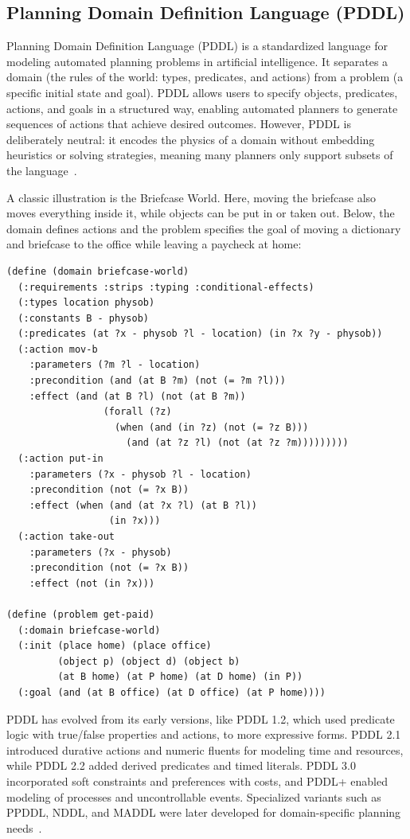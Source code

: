 \documentclass[12pt]{extarticle}
\begin{document}
\subsection{Planning Domain Definition Language (PDDL)}
\label{sec: pddl}
Planning Domain Definition Language (PDDL) is a standardized language for modeling automated planning problems in artificial intelligence. It separates a domain (the rules of the world: types, predicates, and actions) from a problem (a specific initial state and goal). PDDL allows users to specify objects, predicates, actions, and goals in a structured way, enabling automated planners to generate sequences of actions that achieve desired outcomes. However, PDDL is deliberately neutral: it encodes the physics of a domain without embedding heuristics or solving strategies, meaning many planners only support subsets of the language~\cite{pddl-1.2}.

A classic illustration is the Briefcase World. Here, moving the briefcase also moves everything inside it, while objects can be put in or taken out. Below, the domain defines actions and the problem specifies the goal of moving a dictionary and briefcase to the office while leaving a paycheck at home:

\begin{lstlisting}[language=PDDL]
(define (domain briefcase-world)
  (:requirements :strips :typing :conditional-effects)
  (:types location physob)
  (:constants B - physob)
  (:predicates (at ?x - physob ?l - location) (in ?x ?y - physob))
  (:action mov-b
    :parameters (?m ?l - location)
    :precondition (and (at B ?m) (not (= ?m ?l)))
    :effect (and (at B ?l) (not (at B ?m))
                 (forall (?z)
                   (when (and (in ?z) (not (= ?z B)))
                     (and (at ?z ?l) (not (at ?z ?m)))))))))
  (:action put-in
    :parameters (?x - physob ?l - location)
    :precondition (not (= ?x B))
    :effect (when (and (at ?x ?l) (at B ?l))
                  (in ?x)))
  (:action take-out
    :parameters (?x - physob)
    :precondition (not (= ?x B))
    :effect (not (in ?x)))
                     
(define (problem get-paid)
  (:domain briefcase-world)
  (:init (place home) (place office)
         (object p) (object d) (object b)
         (at B home) (at P home) (at D home) (in P))
  (:goal (and (at B office) (at D office) (at P home))))

\end{lstlisting}

PDDL has evolved from its early versions, like PDDL 1.2, which used predicate logic with true/false properties and actions, to more expressive forms. PDDL 2.1 introduced durative actions and numeric fluents for modeling time and resources, while PDDL 2.2 added derived predicates and timed literals. PDDL 3.0 incorporated soft constraints and preferences with costs, and PDDL+ enabled modeling of processes and uncontrollable events. Specialized variants such as PPDDL, NDDL, and MADDL were later developed for domain-specific planning needs~\cite{pddl}.
\end{document}
